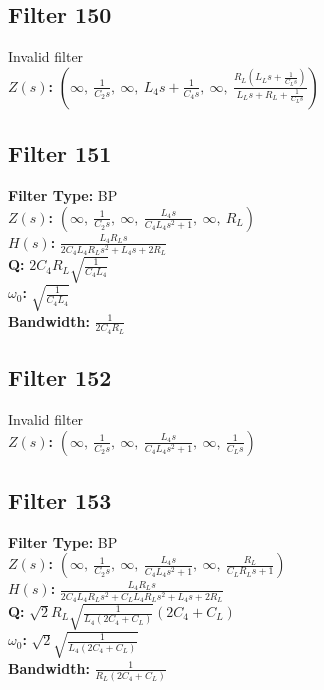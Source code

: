 \documentclass{article}
\begin{document}
\subsection*{Filter 150}
Invalid filter \\ 
\textbf{$Z(s)$:} $\left( \infty, \  \frac{1}{C_{2} s}, \  \infty, \  L_{4} s + \frac{1}{C_{4} s}, \  \infty, \  \frac{R_{L} \left(L_{L} s + \frac{1}{C_{L} s}\right)}{L_{L} s + R_{L} + \frac{1}{C_{L} s}}\right)$ \\ 
\subsection*{Filter 151}
\textbf{Filter Type:} BP \\ 
\textbf{$Z(s)$:} $\left( \infty, \  \frac{1}{C_{2} s}, \  \infty, \  \frac{L_{4} s}{C_{4} L_{4} s^{2} + 1}, \  \infty, \  R_{L}\right)$ \\ 
\textbf{$H(s)$:} $\frac{L_{4} R_{L} s}{2 C_{4} L_{4} R_{L} s^{2} + L_{4} s + 2 R_{L}}$ \\ 
\textbf{Q:} $2 C_{4} R_{L} \sqrt{\frac{1}{C_{4} L_{4}}}$ \\ 
\textbf{$\omega_0$:} $\sqrt{\frac{1}{C_{4} L_{4}}}$ \\ 
\textbf{Bandwidth:} $\frac{1}{2 C_{4} R_{L}}$ \\ 
\subsection*{Filter 152}
Invalid filter \\ 
\textbf{$Z(s)$:} $\left( \infty, \  \frac{1}{C_{2} s}, \  \infty, \  \frac{L_{4} s}{C_{4} L_{4} s^{2} + 1}, \  \infty, \  \frac{1}{C_{L} s}\right)$ \\ 
\subsection*{Filter 153}
\textbf{Filter Type:} BP \\ 
\textbf{$Z(s)$:} $\left( \infty, \  \frac{1}{C_{2} s}, \  \infty, \  \frac{L_{4} s}{C_{4} L_{4} s^{2} + 1}, \  \infty, \  \frac{R_{L}}{C_{L} R_{L} s + 1}\right)$ \\ 
\textbf{$H(s)$:} $\frac{L_{4} R_{L} s}{2 C_{4} L_{4} R_{L} s^{2} + C_{L} L_{4} R_{L} s^{2} + L_{4} s + 2 R_{L}}$ \\ 
\textbf{Q:} $\sqrt{2} R_{L} \sqrt{\frac{1}{L_{4} \left(2 C_{4} + C_{L}\right)}} \left(2 C_{4} + C_{L}\right)$ \\ 
\textbf{$\omega_0$:} $\sqrt{2} \sqrt{\frac{1}{L_{4} \left(2 C_{4} + C_{L}\right)}}$ \\ 
\textbf{Bandwidth:} $\frac{1}{R_{L} \left(2 C_{4} + C_{L}\right)}$ \\ 
\end{document}
